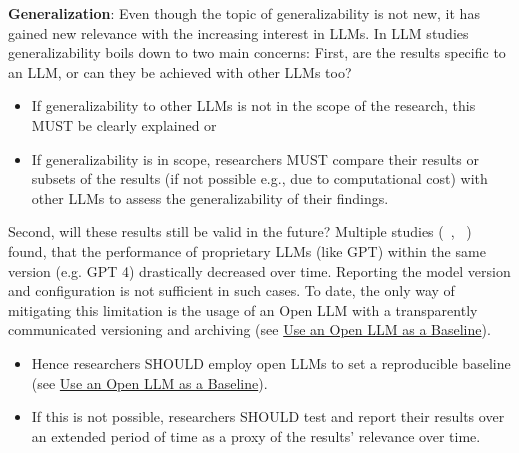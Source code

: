 \textbf{Generalization}:
Even though the topic of generalizability is not new, it has gained new relevance with the increasing interest in LLMs. In LLM studies generalizability boils down to two main concerns: 
First, are the results specific to an LLM, or can they be achieved with other LLMs too? 
\begin{itemize}
  \item If generalizability to other LLMs is not in the scope of the research, this MUST be clearly explained or
  \item If generalizability is in scope, researchers MUST compare their results or subsets of the results (if not possible e.g., due to computational cost) with other LLMs to assess the generalizability of their findings. 
\end{itemize}
Second, will these results still be valid in the future? Multiple studies (~\cite{DBLP:journals/corr/abs-2307-09009}, ~\cite{doi:10.1148/radiol.232411}) found, that the performance of proprietary LLMs (like GPT) within the same version (e.g. GPT 4) drastically decreased over time. Reporting the model version and configuration is not sufficient in such cases. To date, the only way of mitigating this limitation is the usage of an Open LLM with a transparently communicated versioning and archiving (see \href{/guidelines/#use-open-llm}{Use an Open LLM as a Baseline}). 
\begin{itemize}
  \item Hence researchers SHOULD employ open LLMs to set a reproducible baseline (see \href{/guidelines/#use-open-llm}{Use an Open LLM as a Baseline}).
  \item If this is not possible, researchers SHOULD test and report their results over an extended period of time as a proxy of the results' relevance over time.
\end{itemize}

